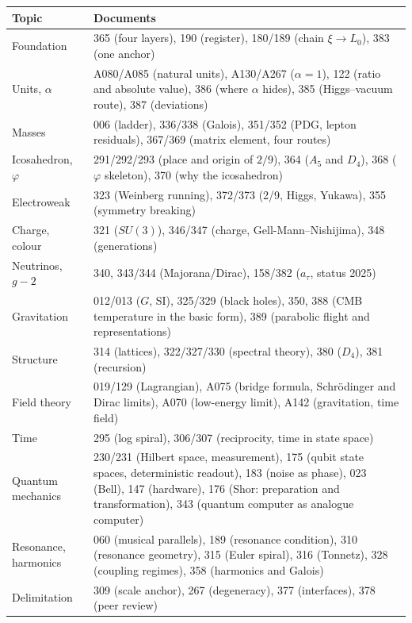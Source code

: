 \begin{center}
\small
{}
\begin{tabular}{@{}p{3.2cm}p{11cm}@{}}
\toprule
\textbf{Topic} & \textbf{Documents} \\
\midrule
Foundation & 365 (four layers), 190 (register), 180/189 (chain $\xi\to L_0$), 383 (one anchor) \\
Units, $\alpha$ & A080/A085 (natural units), A130/A267 ($\alpha=1$), 122 (ratio and absolute value), 386 (where $\alpha$ hides), 385 (Higgs--vacuum route), 387 (deviations) \\
Masses & 006 (ladder), 336/338 (Galois), 351/352 (PDG, lepton residuals), 367/369 (matrix element, four routes) \\
Icosahedron, $\varphi$ & 291/292/293 (place and origin of $2/9$), 364 ($A_5$ and $D_4$), 368 ($\varphi$ skeleton), 370 (why the icosahedron) \\
Electroweak & 323 (Weinberg running), 372/373 (2/9, Higgs, Yukawa), 355 (symmetry breaking) \\
Charge, colour & 321 ($SU(3)$), 346/347 (charge, Gell-Mann--Nishijima), 348 (generations) \\
Neutrinos, $g-2$ & 340, 343/344 (Majorana/Dirac), 158/382 ($a_\tau$, status 2025) \\
Gravitation & 012/013 ($G$, SI), 325/329 (black holes), 350, 388 (CMB temperature in the basic form), 389 (parabolic flight and representations) \\
Structure & 314 (lattices), 322/327/330 (spectral theory), 380 ($D_4$), 381 (recursion) \\
Field theory & 019/129 (Lagrangian), A075 (bridge formula, Schrödinger and Dirac limits), A070 (low-energy limit), A142 (gravitation, time field) \\
Time & 295 (log spiral), 306/307 (reciprocity, time in state space) \\
Quantum mechanics & 230/231 (Hilbert space, measurement), 175 (qubit state spaces, deterministic readout), 183 (noise as phase), 023 (Bell), 147 (hardware), 176 (Shor: preparation and transformation), 343 (quantum computer as analogue computer) \\
Resonance, harmonics & 060 (musical parallels), 189 (resonance condition), 310 (resonance geometry), 315 (Euler spiral), 316 (Tonnetz), 328 (coupling regimes), 358 (harmonics and Galois) \\
Delimitation & 309 (scale anchor), 267 (degeneracy), 377 (interfaces), 378 (peer review) \\
\bottomrule
\end{tabular}
\end{center}

